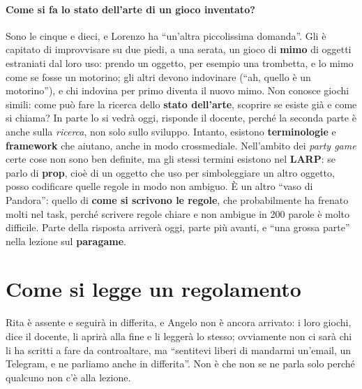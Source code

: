 \paragraph{Come si fa lo stato dell'arte di un gioco inventato?} Sono le cinque e
dieci, e Lorenzo ha ``un'altra piccolissima domanda''. Gli è capitato di improvvisare
su due piedi, a una serata, un gioco di \textbf{mimo} di oggetti estraniati dal loro
uso: prendo un oggetto, per esempio una trombetta, e lo mimo come se fosse un
motorino; gli altri devono indovinare (``ah, quello è un motorino''), e chi indovina
per primo diventa il nuovo mimo. Non conosce giochi simili: come può fare la ricerca
dello \textbf{stato dell'arte}, scoprire se esiste già e come si chiama? In parte lo
si vedrà oggi, risponde il docente, perché la seconda parte è anche sulla
\emph{ricerca}, non solo sullo sviluppo. Intanto, esistono \textbf{terminologie} e
\textbf{framework} che aiutano, anche in modo crossmediale. Nell'ambito dei
\emph{party game} certe cose non sono ben definite, ma gli stessi termini esistono
nel \textbf{LARP}: se parlo di \textbf{prop}, cioè di un oggetto che uso per
simboleggiare un altro oggetto, posso codificare quelle regole in modo non ambiguo.
È un altro ``vaso di Pandora'': quello di \textbf{come si scrivono le regole}, che
probabilmente ha frenato molti nel task, perché scrivere regole chiare e non ambigue
in 200 parole è molto difficile. Parte della risposta arriverà oggi, parte più
avanti, e ``una grossa parte'' nella lezione sul \textbf{paragame}.

\section{Come si legge un regolamento}
\label{a6:sec:metodo}

Rita è assente e seguirà in differita, e Angelo non è ancora arrivato: i loro
giochi, dice il docente, li aprirà alla fine e li leggerà lo stesso; ovviamente non
ci sarà chi li ha scritti a fare da controaltare, ma ``sentitevi liberi di mandarmi
un'email, un Telegram, e ne parliamo anche in differita''. Non è che non se ne parla
solo perché qualcuno non c'è alla lezione.

